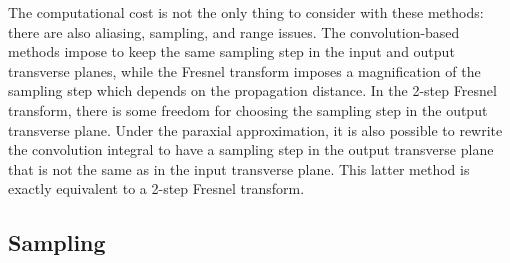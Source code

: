 \documentclass[a4paper]{article}
\begin{document}
The computational cost is not the only thing to consider with these methods: there are
also aliasing, sampling, and range issues. The convolution-based methods impose to keep
the same sampling step in the input and output transverse planes, while the Fresnel
transform imposes a magnification of the sampling step which depends on the propagation
distance. In the 2-step Fresnel transform, there is some freedom for choosing the sampling
step in the output transverse plane. Under the paraxial approximation, it is also possible
to rewrite the convolution integral to have a sampling step in the output transverse plane
that is not the same as in the input transverse plane. This latter method is exactly
equivalent to a 2-step Fresnel transform.

\subsection{Sampling}
\end{document}

